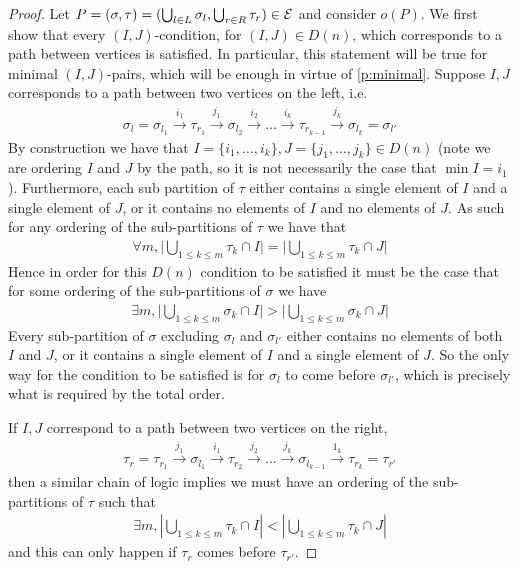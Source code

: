 \begin{proof}
Let $P=(\sigma,\tau) = (\bigcup_{l\in L}\sigma_l,\bigcup_{r\in R} \tau_r) \in \mathcal{E}$ and consider $o(P)$. 
We first show that every $(I,J)$-condition, for $(I,J) \in D(n)$, which corresponds to a path between vertices is satisfied. 
In particular, this statement will be true for minimal $(I,J)$-pairs, which will be enough in virtue of \cref{p:minimal}. 
Suppose $I,J$ corresponds to a path between two vertices on the left, i.e.
\begin{align*}
    \sigma_l = \sigma_{l_1} \xrightarrow{i_1} \tau_{r_1}\xrightarrow{j_1} \sigma_{l_2} \xrightarrow{i_2}\dots \xrightarrow{i_{k}} \tau_{r_{k-1}} \xrightarrow{j_k} \sigma_{l_k}= \sigma_{l'}
\end{align*}
By construction we have that $I = \{i_1,\dots,i_k\},J=\{j_1,\dots,j_k\} \in D(n)$ (note we are ordering $I$ and $J$ by the path, so it is not necessarily the case that $\min I = i_1$). 
Furthermore, each sub partition of $\tau$ either contains a single element of $I$ and a single element of $J$, or it contains no elements of $I$ and no elements of $J$. 
As such for any ordering of the sub-partitions of $\tau$ we have that 
\begin{align*}
    \forall m, \bigg|\bigcup_{1\leq k \leq m} \tau_{k} \cap I \bigg| = \bigg|\bigcup_{1\leq k \leq m} \tau_{k} \cap J \bigg|
\end{align*}
Hence in order for this $D(n)$ condition to be satisfied it must be the case that for some ordering of the sub-partitions of $\sigma$ we have
\begin{align*}
    \exists m, \bigg| \bigcup_{1\leq k \leq m} \sigma_k \cap I \bigg| > \bigg|\bigcup_{1\leq k \leq m} \sigma_k \cap J \bigg|
\end{align*}
Every sub-partition of $\sigma$ excluding $\sigma_l$ and $\sigma_{l'}$ either contains no elements of both $I$ and $J$, or it contains a single element of $I$ and a single element of $J$. 
So the only way for the condition to be satisfied is for $\sigma_l$ to come before $\sigma_{l'}$, which is precisely what is required by the total order.

If $I,J$ correspond to a path between two vertices on the right,
\begin{align*}
    \tau_r = \tau_{r_1} \xrightarrow{j_1} \sigma_{l_1}\xrightarrow{i_1} \tau_{r_2} \xrightarrow{j_2}\dots \xrightarrow{j_{k}} \sigma_{l_{k-1}} \xrightarrow{1_k} \tau_{r_k}=\tau_{r'}
\end{align*}
then a similar chain of logic implies we must have an ordering of the sub-partitions of $\tau$ such that
\begin{align*}
    \exists m, |\bigcup_{1\leq k \leq m}\tau_k \cap I| < |\bigcup_{1\leq k \leq m} \tau_k \cap J|
\end{align*}
and this can only happen if $\tau_r$ comes before $\tau_{r'}$.
\end{proof}

